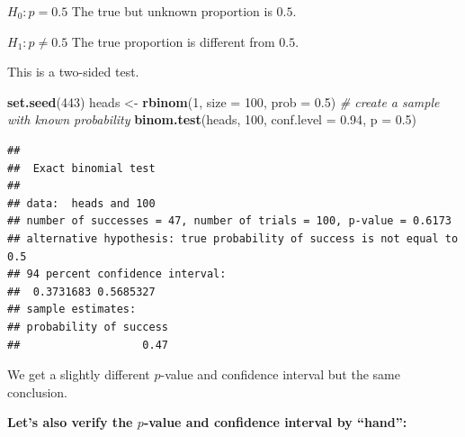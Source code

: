 \documentclass[
]{book}
\newenvironment{Shaded}{\begin{snugshade}}{\end{snugshade}}
\newcommand{\AttributeTok}[1]{\textcolor[rgb]{0.13,0.29,0.53}{#1}}
\newcommand{\CommentTok}[1]{\textcolor[rgb]{0.56,0.35,0.01}{\textit{#1}}}
\newcommand{\DecValTok}[1]{\textcolor[rgb]{0.00,0.00,0.81}{#1}}
\newcommand{\FloatTok}[1]{\textcolor[rgb]{0.00,0.00,0.81}{#1}}
\newcommand{\FunctionTok}[1]{\textcolor[rgb]{0.13,0.29,0.53}{\textbf{#1}}}
\newcommand{\NormalTok}[1]{#1}
\newcommand{\OtherTok}[1]{\textcolor[rgb]{0.56,0.35,0.01}{#1}}
\begin{document}
\(H_0: p = 0.5\) The true but unknown proportion is \(0.5\).

\(H_1: p \ne 0.5\) The true proportion is different from \(0.5\).

This is a two-sided test.

\begin{Shaded}
\begin{Highlighting}[]
\FunctionTok{set.seed}\NormalTok{(}\DecValTok{443}\NormalTok{)}
\NormalTok{heads }\OtherTok{\textless{}{-}} \FunctionTok{rbinom}\NormalTok{(}\DecValTok{1}\NormalTok{, }\AttributeTok{size =} \DecValTok{100}\NormalTok{,}
                \AttributeTok{prob =} \FloatTok{0.5}\NormalTok{) }\CommentTok{\# create a sample with known probability}
\FunctionTok{binom.test}\NormalTok{(heads, }\DecValTok{100}\NormalTok{,}
           \AttributeTok{conf.level =} \FloatTok{0.94}\NormalTok{, }\AttributeTok{p =} \FloatTok{0.5}\NormalTok{)}
\end{Highlighting}
\end{Shaded}

\begin{verbatim}
## 
##  Exact binomial test
## 
## data:  heads and 100
## number of successes = 47, number of trials = 100, p-value = 0.6173
## alternative hypothesis: true probability of success is not equal to 0.5
## 94 percent confidence interval:
##  0.3731683 0.5685327
## sample estimates:
## probability of success 
##                   0.47
\end{verbatim}

We get a slightly different \(p\)-value and confidence interval but the same conclusion.

\textbf{Let's also verify the \(p\)-value and confidence interval by ``hand'':}
\end{document}
